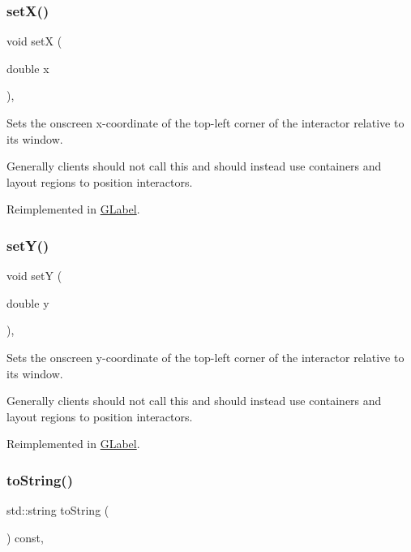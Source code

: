 \subsubsection{\texorpdfstring{set\+X()}{setX()}}
{\footnotesize\ttfamily void setX (\begin{DoxyParamCaption}\item[{double}]{x }\end{DoxyParamCaption})\hspace{0.3cm}{\ttfamily [virtual]}, {\ttfamily [inherited]}}



Sets the onscreen x-\/coordinate of the top-\/left corner of the interactor relative to its window. 

Generally clients should not call this and should instead use containers and layout regions to position interactors. 

Reimplemented in \mbox{\hyperlink{classGLabel_af7260dc32f150e3a5072e7e8eb2628b1}{G\+Label}}.

\mbox{\label{classGInteractor_a7d57e2a5c35d27feb58fd498a3cf82b9}} 
\subsubsection{\texorpdfstring{set\+Y()}{setY()}}
{\footnotesize\ttfamily void setY (\begin{DoxyParamCaption}\item[{double}]{y }\end{DoxyParamCaption})\hspace{0.3cm}{\ttfamily [virtual]}, {\ttfamily [inherited]}}



Sets the onscreen y-\/coordinate of the top-\/left corner of the interactor relative to its window. 

Generally clients should not call this and should instead use containers and layout regions to position interactors. 

Reimplemented in \mbox{\hyperlink{classGLabel_a59633abb35b676c54d88ea6cd384fc55}{G\+Label}}.

\mbox{\label{classGObservable_a1fe5121d6528fdea3f243321b3fa3a49}} 
\subsubsection{\texorpdfstring{to\+String()}{toString()}}
{\footnotesize\ttfamily std\+::string to\+String (\begin{DoxyParamCaption}{ }\end{DoxyParamCaption}) const\hspace{0.3cm}{\ttfamily [virtual]}, {\ttfamily [inherited]}}




